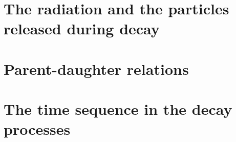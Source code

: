 \section{The radiation and the particles released during decay}
\section{Parent-daughter relations}
\section{The time sequence in the decay processes}
